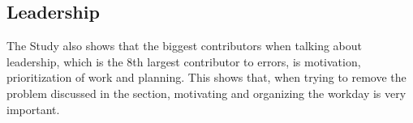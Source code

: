 \subsection{Leadership}
The Study also shows that the biggest contributors when talking about leadership, which is the 8th largest contributor to errors, is motivation, prioritization of work and planning. This shows that, when trying to remove the problem discussed in the section, motivating and organizing the workday is very important.